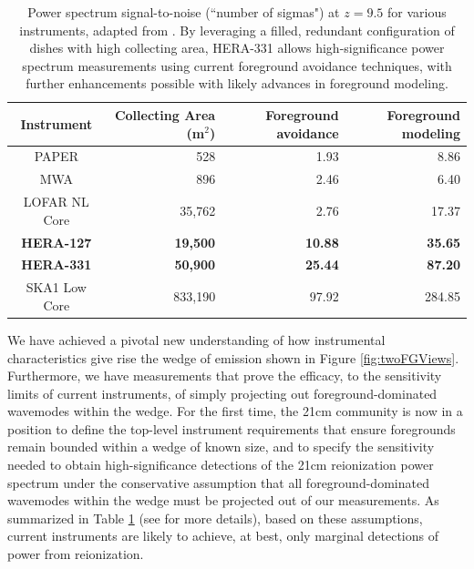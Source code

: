 \documentclass[preprint]{aastex}
\begin{document}

\begin{table}[t]
\centering
\begin{tabular}{c||r||r|r} 
Instrument & Collecting Area (m$^2$) & Foreground avoidance & Foreground modeling \\
\hline
PAPER & 528 & 1.93 & 8.86 \\
MWA & 896 & 2.46 & 6.40 \\
LOFAR NL Core & 35,762 & 2.76 & 17.37 \\
\textbf{HERA-127} & \textbf{19,500} & \textbf{10.88} & \textbf{35.65} \\
\textbf{HERA-331} & \textbf{50,900} & \textbf{25.44} & \textbf{87.20} \\
SKA1 Low Core & 833,190 & 97.92 & 284.85 \\
\end{tabular}
\caption{\small
Power spectrum signal-to-noise (``number of sigmas") at $z=9.5$ for various instruments, adapted from \citet{pober_et_al2014}.  By leveraging a filled, redundant configuration of dishes with high collecting area, HERA-331 allows high-significance power spectrum measurements using current foreground avoidance techniques, with further enhancements possible with likely advances in foreground modeling.}
\label{tab:signif}
\end{table}


We have achieved a
pivotal new understanding of how instrumental characteristics give rise the
wedge of emission shown in Figure \ref{fig:twoFGViews}.  Furthermore, we have
measurements that prove the efficacy, to the sensitivity limits of current
instruments, of simply projecting out foreground-dominated wavemodes within the
wedge.  For the first time, the 21cm community is now in a position to define
the top-level instrument requirements that ensure foregrounds remain bounded
within a wedge of known size, and to specify the sensitivity needed to obtain
high-significance detections of the 21cm reionization power spectrum under the
conservative assumption that all foreground-dominated wavemodes within the
wedge must be projected out of our measurements.
As summarized in Table \ref{tab:signif} (see \citealt{pober_et_al2014} for more details),
based on these assumptions, current instruments are likely to achieve,
at best, only marginal detections of power from reionization.
\end{document}
